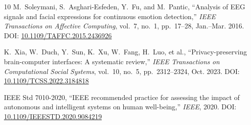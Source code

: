\documentclass[journal]{IEEEtran}
\begin{document}
\begin{thebibliography}{10}
M.~Soleymani, S.~Asghari-Esfeden, Y.~Fu, and M.~Pantic, ``Analysis of EEG signals and facial expressions for continuous emotion detection,'' \emph{IEEE Transactions on Affective Computing}, vol.~7, no.~1, pp.~17--28, Jan.--Mar. 2016. DOI: \href{https://doi.org/10.1109/TAFFC.2015.2436926}{10.1109/TAFFC.2015.2436926}

K.~Xia, W.~Duch, Y.~Sun, K.~Xu, W.~Fang, H.~Luo, et al., ``Privacy-preserving brain-computer interfaces: A systematic review,'' \emph{IEEE Transactions on Computational Social Systems}, vol.~10, no.~5, pp.~2312--2324, Oct. 2023. DOI: \href{https://doi.org/10.1109/TCSS.2022.3184818}{10.1109/TCSS.2022.3184818}

IEEE Std 7010-2020, ``IEEE recommended practice for assessing the impact of autonomous and intelligent systems on human well-being,'' \emph{IEEE}, 2020. DOI: \href{https://doi.org/10.1109/IEEESTD.2020.9084219}{10.1109/IEEESTD.2020.9084219}

\end{thebibliography}
\end{document}
